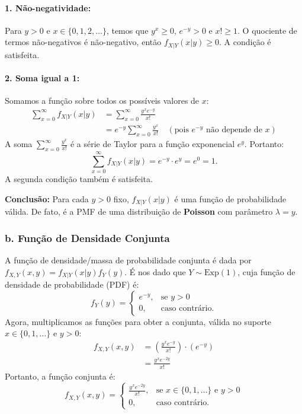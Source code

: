 \documentclass[12pt]{article}
\begin{document}
\paragraph{1. Não-negatividade:}
Para $y > 0$ e $x \in \{0, 1, 2, \dots\}$, temos que $y^x \ge 0$, $e^{-y} > 0$ e $x! \ge 1$. O quociente de termos não-negativos é não-negativo, então $f_{X|Y}(x|y) \ge 0$. A condição é satisfeita.

\paragraph{2. Soma igual a 1:}
Somamos a função sobre todos os possíveis valores de $x$:
\begin{align*}
\sum_{x=0}^{\infty} f_{X|Y}(x|y) &= \sum_{x=0}^{\infty} \frac{y^x e^{-y}}{x!} \\
&= e^{-y} \sum_{x=0}^{\infty} \frac{y^x}{x!} \quad (\text{pois } e^{-y} \text{ não depende de } x)
\end{align*}
A soma $\sum_{x=0}^{\infty} \frac{y^x}{x!}$ é a série de Taylor para a função exponencial $e^y$. Portanto:
\[ \sum_{x=0}^{\infty} f_{X|Y}(x|y) = e^{-y} \cdot e^y = e^0 = 1. \]
A segunda condição também é satisfeita.

\textbf{Conclusão:} Para cada $y>0$ fixo, $f_{X|Y}(x|y)$ é uma função de probabilidade válida. De fato, é a PMF de uma distribuição de \textbf{Poisson} com parâmetro $\lambda=y$.

\subsubsection*{b. Função de Densidade Conjunta}
A função de densidade/massa de probabilidade conjunta é dada por $f_{X,Y}(x,y) = f_{X|Y}(x|y) f_Y(y)$.
É nos dado que $Y \sim \text{Exp}(1)$, cuja função de densidade de probabilidade (PDF) é:
\[ f_Y(y) = \begin{cases} e^{-y}, & \text{se } y > 0 \\ 0, & \text{caso contrário.} \end{cases} \]
Agora, multiplicamos as funções para obter a conjunta, válida no suporte $x \in \{0, 1, \dots\}$ e $y > 0$:
\begin{align*}
f_{X,Y}(x,y) &= \left( \frac{y^x e^{-y}}{x!} \right) \cdot (e^{-y}) \\
&= \frac{y^x e^{-2y}}{x!}
\end{align*}
Portanto, a função conjunta é:
\[ f_{X,Y}(x,y) = \begin{cases} \frac{y^x e^{-2y}}{x!}, & \text{se } x \in \{0, 1, \dots\} \text{ e } y > 0 \\ 0, & \text{caso contrário.} \end{cases} \]
\end{document}
